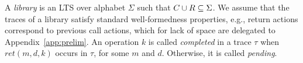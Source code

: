 
%
%
%

A \emph{library} is an LTS over alphabet $\Sigma$ such that $C \cup R\subseteq \Sigma$. 
We assume that the traces of a library satisfy standard well-formedness properties, 
e.g., return actions correspond to previous call actions, which for lack of 
space are delegated to Appendix~\ref{app:prelim}. An operation $k$ is called \emph{completed} in a trace $\tau$ when
$ret(m,d,k)$ occurs in $\tau$, for some $m$ and $d$. Otherwise, it is called \emph{pending}.


